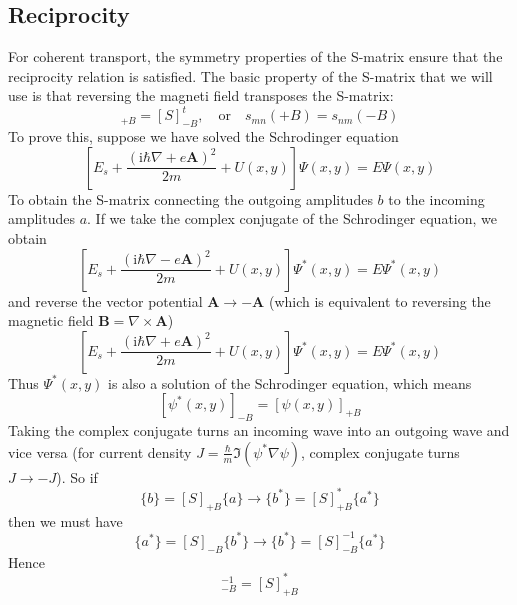 \documentclass[11pt,a4paper]{book}
\theoremstyle{plain}
\theoremstyle{definition}
\theoremstyle{remark}
\newcommand{\ii}{\mathrm{i}}                      %
\renewcommand{\vec}[1]{\boldsymbol{#1}}
\begin{document}
\subsection{Reciprocity}
For coherent transport, the symmetry properties of the S-matrix ensure that the reciprocity relation is satisfied. The basic property of the S-matrix that we will use is that reversing the magneti field transposes the S-matrix:
\begin{equation}
    [S]_{+B} = [S]^t_{-B},\quad \mbox{or} \quad s_{mn}(+B) = s_{nm}(-B)
\end{equation}
To prove this, suppose we have solved the Schrodinger equation
\begin{equation}
    \left[E_s + \frac{(\ii \hbar \nabla + e\vec{A})^2}{2 m} + U(x,y) \right] \Psi(x,y) = E \Psi(x,y)
\end{equation}
To obtain the S-matrix connecting the outgoing amplitudes ${b}$ to the incoming amplitudes ${a}$. If we take the complex conjugate of the Schrodinger equation, we obtain
\begin{equation}
    \left[E_s + \frac{(\ii \hbar \nabla - e\vec{A})^2}{2 m} + U(x,y) \right] \Psi^*(x,y) = E \Psi^*(x,y)
\end{equation}
and reverse the vector potential $\vec{A} \rightarrow -\vec{A}$ (which is equivalent to reversing the magnetic field $\vec{B} = \nabla \times \vec{A}$)
\begin{equation}
    \left[E_s + \frac{(\ii \hbar \nabla + e\vec{A})^2}{2 m} + U(x,y) \right] \Psi^*(x,y) = E \Psi^*(x,y)
\end{equation}
Thus $\Psi^*(x,y)$ is also a solution of the Schrodinger equation, which means
\begin{equation}
    \left[\psi^*(x,y)\right]_{-B} = \left[\psi(x,y)\right]_{+B}
\end{equation}
Taking the complex conjugate turns an incoming wave into an outgoing wave and vice versa (for current density $J = \frac{\hbar}{m} \Im(\psi^* \nabla \psi)$, complex conjugate turns $J\to -J$). So if
\begin{equation}
    \{b\} = [S]_{+B} \{a\} \rightarrow \{b^*\} = [S]^*_{+B} \{a^*\}
\end{equation}
then we must have
\begin{equation}
    \{a^*\} = [S]_{-B} \{b^*\} \rightarrow \{b^*\} = [S]^{-1}_{-B} \{a^*\}
\end{equation}
Hence
\begin{equation}
    [S]^{-1}_{-B} = [S]^*_{+B}
\end{equation}
\end{document}
